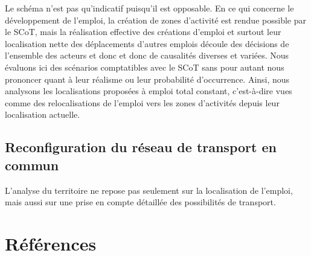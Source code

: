 \documentclass[
  10pt,
  a4paper,
  numbers=noendperiod,
  DIV=9]{scrartcl}
\begin{document}
Le schéma n'est pas qu'indicatif puisqu'il est opposable. En ce qui
concerne le développement de l'emploi, la création de zones d'activité
est rendue possible par le SCoT, mais la réalisation effective des
créations d'emploi et surtout leur localisation nette des déplacements
d'autres emplois découle des décisions de l'ensemble des acteurs et donc
et donc de causalités diverses et variées. Nous évaluons ici des
scénarios comptatibles avec le SCoT sans pour autant nous prononcer
quant à leur réalisme ou leur probabilité d'occurrence. Ainsi, nous
analysons les localisations proposées à emploi total constant,
c'est-à-dire vues comme des relocalisations de l'emploi vers les zones
d'activités depuis leur localisation actuelle.

\hypertarget{reconfiguration-du-ruxe9seau-de-transport-en-commun}{%
\section{Reconfiguration du réseau de transport en
commun}\label{reconfiguration-du-ruxe9seau-de-transport-en-commun}}

L'analyse du territoire ne repose pas seulement sur la localisation de
l'emploi, mais aussi sur une prise en compte détaillée des possibilités
de transport.


\hypertarget{ruxe9fuxe9rences}{%
\chapter*{Références}\label{ruxe9fuxe9rences}}

\end{document}
